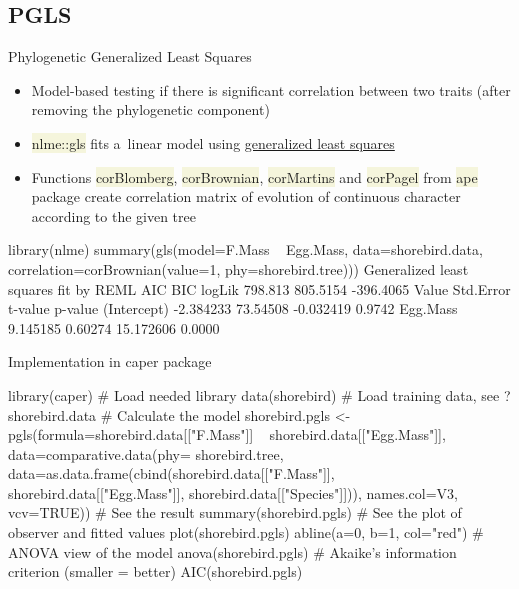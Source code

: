 \documentclass[compress, xelatex, 11pt, xcolor=svgnames, aspectratio=169, url={hyphens, lowtilde}]{beamer}
\renewcommand{\texttt}[1]{\colorbox{Beige}{{\ttfamily #1}}}
\begin{document}
\subsection{PGLS}

\begin{frame}[fragile]{Phylogenetic Generalized Least Squares}
	\begin{itemize}
		\item Model-based testing if there is significant correlation between two traits (after removing the phylogenetic component)
		\item \texttt{nlme::gls} fits a~linear model using \href{https://en.wikipedia.org/wiki/Generalized_least_squares}{generalized least squares}
		\item Functions \texttt{corBlomberg}, \texttt{corBrownian}, \texttt{corMartins} and \texttt{corPagel} from \texttt{ape} package create correlation matrix of evolution of continuous character according to the given tree
	\end{itemize}
	\begin{spluscode}
    library(nlme)
    summary(gls(model=F.Mass ~ Egg.Mass, data=shorebird.data,
      correlation=corBrownian(value=1, phy=shorebird.tree)))
      Generalized least squares fit by REML
          AIC      BIC    logLik
      798.813 805.5154 -396.4065
                    Value Std.Error   t-value p-value
    (Intercept) -2.384233  73.54508 -0.032419  0.9742
    Egg.Mass     9.145185   0.60274 15.172606  0.0000
\end{spluscode}
\end{frame}

\begin{frame}[fragile]{Implementation in caper package}
	\begin{spluscode}
    library(caper) # Load needed library
    data(shorebird) # Load training data, see ?shorebird.data
    # Calculate the model
    shorebird.pgls <- pgls(formula=shorebird.data[["F.Mass"]] ~
      shorebird.data[["Egg.Mass"]], data=comparative.data(phy=
      shorebird.tree, data=as.data.frame(cbind(shorebird.data[["F.Mass"]],
      shorebird.data[["Egg.Mass"]], shorebird.data[["Species"]])),
      names.col=V3, vcv=TRUE))
    # See the result
    summary(shorebird.pgls)
    # See the plot of observer and fitted values
    plot(shorebird.pgls)
    abline(a=0, b=1, col="red")
    # ANOVA view of the model
    anova(shorebird.pgls)
    # Akaike's information criterion (smaller = better)
    AIC(shorebird.pgls)
	\end{spluscode}
\end{frame}
\end{document}
